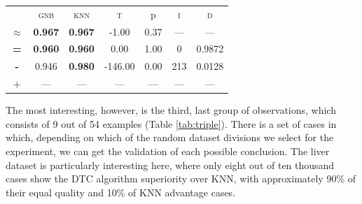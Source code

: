 \documentclass[12pt,a4paper]{report}
\begin{document}
\begin{table}[!h]
{\begin{tabular}{c||cc||c|c|c||c}
\midrule	&\textsc{gnb} & \textsc{knn} & \textsc{t} & p & \textsc{i} & \textsc{d}\\
	\color{black} $\approx$ & \color{black} \bfseries 0.967 &\color{black}  \bfseries 0.967 & -1.00 & 0.37 & --- & ---\\\midrule
	{\bfseries\color{black}\tiny=}& \color{black} \bfseries 0.960 & \color{black} \bfseries 0.960 & 0.00 & 1.00 & 0 & \color{black} 0.9872\\
	{\bfseries\color{blue}\tiny-}& \color{blue}  0.946 & \color{blue} \bfseries 0.980 & -146.00 & 0.00 & 213 & \color{blue} 0.0128\\
	{\tiny+}& --- & --- & --- & --- & --- & ---\\
	\bottomrule
\end{tabular}
}
\end{table}

The most interesting, however, is the third, last group of observations, which consists of 9 out of 54 examples (Table \ref{tab:triple}). There is a set of cases in which, depending on which of the random dataset divisions we select for the experiment, we can get the validation of each possible conclusion. The liver dataset is particularly interesting here, where only eight out of ten thousand cases show the DTC algorithm superiority over KNN, with approximately 90\% of their equal quality and 10\% of KNN advantage cases.
\end{document}
